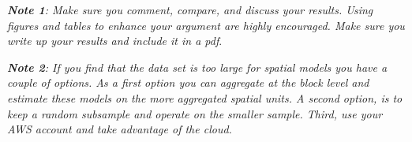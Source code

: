 \documentclass[12pt]{article}
\begin{document}
\begin{enumerate}
\begin{enumerate}
  \end{enumerate}
  {\it {\bf Note 1}: Make sure you comment, compare, and discuss your results. Using figures and tables to enhance your argument are highly encouraged. Make sure you write up your results and include it in a pdf}.

  {\it {\bf Note 2}: If you find that the data set is too large for spatial models you have a couple of options. As a first option you can aggregate at the block level and estimate these models on the more aggregated spatial units. A second option, is to keep a random subsample and operate on the smaller sample. Third, use your AWS account and take advantage of the cloud.}
\end{enumerate}
\end{document}

